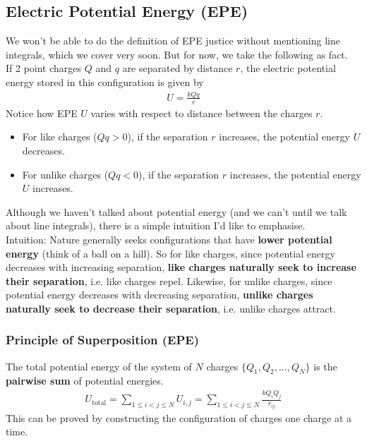 \documentclass{article}
\begin{document}
\subsection{Electric Potential Energy (EPE)}
We won't be able to do the definition of EPE justice without mentioning line integrals, which we cover very soon. But for now, we take the following as fact. \\[10pt]
If 2 point charges $Q$ and $q$ are separated by distance $r$, the electric potential energy stored in this configuration is given by
\begin{align}
    U = \frac{kQq}{r}
\end{align}
Notice how EPE $U$ varies with respect to distance between the charges $r$.
\begin{itemize}
    \item For like charges ($Qq>0$), if the separation $r$ increases, the potential energy $U$ decreases.
    \item For unlike charges ($Qq<0$), if the separation $r$ increases, the potential energy $U$ increases.
\end{itemize}
Although we haven't talked about potential energy (and we can't until we talk about line integrals), there is a simple intuition I'd like to emphasise. \\[10pt]
Intuition: Nature generally seeks configurations that have \textbf{lower potential energy} (think of a ball on a hill). So for like charges, since potential energy decreases with increasing separation, \textbf{like charges naturally seek to increase their separation}, i.e. like charges repel. Likewise, for unlike charges, since potential energy decreases with decreasing separation, \textbf{unlike charges naturally seek to decrease their separation}, i.e. unlike charges attract.
\subsubsection{Principle of Superposition (EPE)}
The total potential energy of the system of $N$ charges $\{Q_1, Q_2, ..., Q_N\}$ is the \textbf{pairwise sum} of potential energies.
\begin{align}
    U_{\text{total}} = \sum_{1\leq i<j \leq N} U_{i,j} = \sum_{1\leq i<j \leq N} \frac{kQ_i Q_j}{r_{ij}}
\end{align}
This can be proved by constructing the configuration of charges one charge at a time. 
\end{document}
